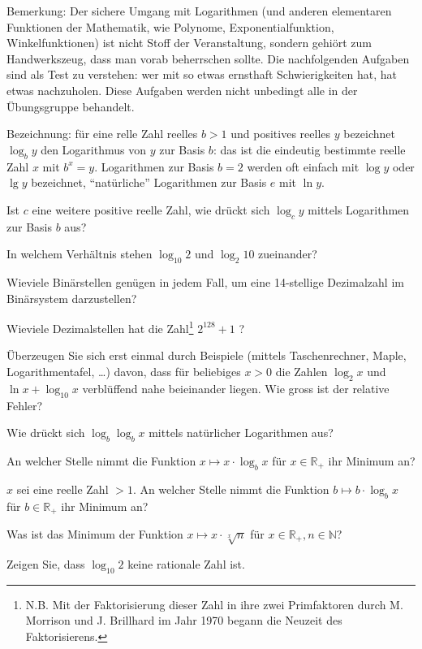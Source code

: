 
Bemerkung: Der sichere Umgang mit Logarithmen (und anderen elementaren
Funktionen der Mathematik, wie Polynome, Exponentialfunktion,
Winkelfunktionen) ist nicht Stoff der Veranstaltung,
sondern gehiört zum Handwerkszeug, dass man vorab beherrschen sollte.
Die nachfolgenden Aufgaben sind als Test zu verstehen: wer mit so etwas
ernsthaft Schwierigkeiten hat, hat etwas nachzuholen.
Diese Aufgaben werden nicht unbedingt alle in der Übungsgruppe behandelt.

Bezeichnung: für eine relle Zahl reelles $b>1$ und positives reelles $y$ 
bezeichnet $\log_b y$  den Logarithmus
von $y$ zur Basis $b$:
das ist die eindeutig bestimmte reelle Zahl $x$ mit $b^x = y$.
Logarithmen zur Basis $b=2$ werden oft einfach mit $\log y$ oder $\lg y$ bezeichnet, ``natürliche''
Logarithmen zur Basis $e$ mit $\ln y$.

\begin{flushenum}
\item
Ist $c$ eine weitere positive reelle Zahl, wie  drückt sich $\log_c y$
mittels Logarithmen zur Basis $b$ aus?
\item
In welchem Verhältnis stehen $\log_{10}2$ und $\log_2 10$ zueinander?
\item
Wieviele Binärstellen genügen in jedem Fall, 
um eine 14-stellige Dezimalzahl im Binärsystem darzustellen?
\item
Wieviele Dezimalstellen hat die Zahl\footnote{
N.B. Mit der Faktorisierung dieser Zahl in ihre zwei Primfaktoren
durch M. Morrison und J. Brillhard 
im Jahr 1970 begann die Neuzeit des Faktorisierens.} $2^{128}+1$ ?
\item
\"Uberzeugen Sie sich erst einmal durch Beispiele 
(mittels Taschenrechner, Maple, Logarithmentafel, \ldots) davon, 
dass für beliebiges $x >0$ die Zahlen
$\log_2 x$ und $\ln x + \log_{10} x$ verblüffend nahe beieinander liegen. 
Wie gross ist der relative Fehler?
\item
Wie drückt sich $\log_b \log_b x$ mittels natürlicher Logarithmen aus?
\item
An welcher Stelle nimmt die Funktion 
$x \mapsto x \cdot \log_b x$ für $x \in \mathbb{R}_+$
ihr Minimum an? 
\item
$x$ sei eine reelle Zahl $>1$. An welcher Stelle nimmt die Funktion 
$b \mapsto b \cdot \log_b x$ für $b \in \mathbb{R}_+$
ihr Minimum an? 
\item
Was ist das Minimum der Funktion 
$x \mapsto x \cdot \sqrt[x]{n}$ für $x \in \mathbb{R}_+, n \in \mathbb{N}$?
\item
Zeigen Sie, dass $\log_{10} 2$ keine rationale Zahl ist.

\end{flushenum}


